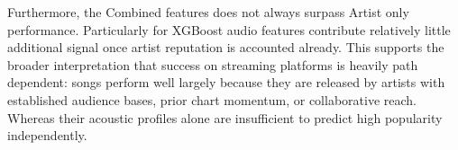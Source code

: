 \documentclass{article}
\begin{document}
Furthermore, the Combined features does not always surpass Artist only performance. Particularly for XGBoost audio features contribute relatively little additional signal once artist reputation is accounted already. This supports the broader interpretation that success on streaming platforms is heavily path dependent: songs perform well largely because they are released by artists with established audience bases, prior chart momentum, or collaborative reach. Whereas their acoustic profiles alone are insufficient to predict high popularity independently.



\end{document}
